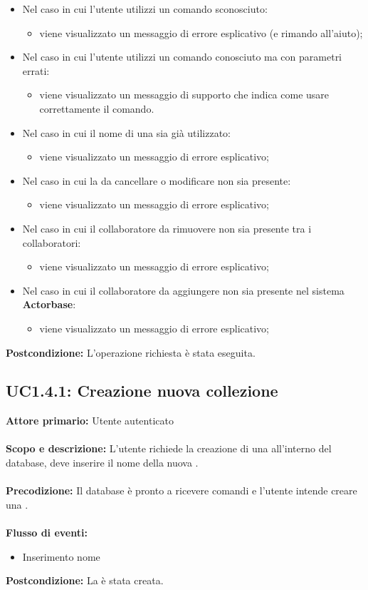 \documentclass{scalatekids-article}
\begin{document}
\begin{itemize}
\item Nel caso in cui l'utente utilizzi un comando sconosciuto:
  \begin{itemize}
  \item viene visualizzato un messaggio di errore esplicativo (e rimando all'aiuto);
  \end{itemize}
\item Nel caso in cui l'utente utilizzi un comando conosciuto ma con parametri errati:
  \begin{itemize}
  \item viene visualizzato un messaggio di supporto che indica come usare correttamente il comando.
  \end{itemize}
\item Nel caso in cui il nome di una  sia già utilizzato:
  \begin{itemize}
  \item viene visualizzato un messaggio di errore esplicativo;
  \end{itemize}
\item Nel caso in cui la  da cancellare o modificare non sia presente:
  \begin{itemize}
  \item viene visualizzato un messaggio di errore esplicativo;
  \end{itemize}
\item Nel caso in cui il collaboratore da rimuovere non sia presente tra i collaboratori:
  \begin{itemize}
  \item viene visualizzato un messaggio di errore esplicativo;
  \end{itemize}
\item Nel caso in cui il collaboratore da aggiungere non sia presente nel sistema \textbf{Actorbase}:
  \begin{itemize}
  \item viene visualizzato un messaggio di errore esplicativo;
  \end{itemize}
\end{itemize}
\textbf{Postcondizione:} L'operazione richiesta è stata eseguita.
\subsection{UC1.4.1: Creazione nuova collezione}
\textbf{Attore primario:} Utente autenticato\\ \\
\textbf{Scopo e descrizione:} L'utente richiede la creazione di una  all'interno del database, deve inserire il nome della nuova .\\ \\
\textbf{Precodizione:} Il database è pronto a ricevere comandi e l'utente intende creare una .\\ \\
\textbf{Flusso di eventi:}
\begin{itemize}
\item Inserimento nome 
\end{itemize}
\textbf{Postcondizione:} La  è stata creata.
\end{document}
